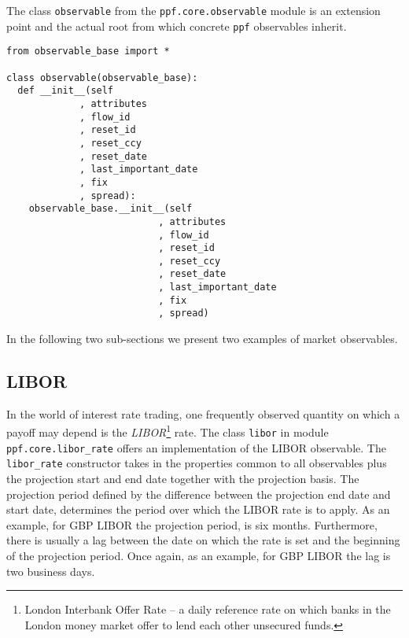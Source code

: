 The class \verb|observable| from the \verb|ppf.core.observable| module
is an extension point and the actual root from which concrete
\verb|ppf| observables inherit.
\begin{verbatim}
from observable_base import *

class observable(observable_base):
  def __init__(self
             , attributes
             , flow_id
             , reset_id
             , reset_ccy
             , reset_date
             , last_important_date
             , fix
             , spread):
    observable_base.__init__(self
                           , attributes
                           , flow_id
                           , reset_id
                           , reset_ccy
                           , reset_date
                           , last_important_date
                           , fix
                           , spread)      
\end{verbatim}
In the following two sub-sections we present two examples of market
observables.

\subsection{LIBOR}\label{sec:libor}
In the world of interest rate trading, one frequently observed
quantity on which a payoff may depend is the
\emph{LIBOR}\footnote{London Interbank Offer Rate -- a daily reference
rate on which banks in the London money market offer to lend each
other unsecured funds.}
rate. The class \verb|libor| in module \\
\verb|ppf.core.libor_rate| offers an implementation of the LIBOR
observable. The \verb|libor_rate| constructor takes in the properties
common to all observables plus the projection start and end date
together with the projection basis. The projection period defined by
the difference between the projection end date and start date,
determines the period over which the LIBOR rate is to apply. As an
example, for GBP LIBOR the projection period, is six
months. Furthermore, there is usually a lag between the date on which
the rate is set and the beginning of the projection period. Once again, as
an example, for GBP LIBOR the lag is two business days. 

